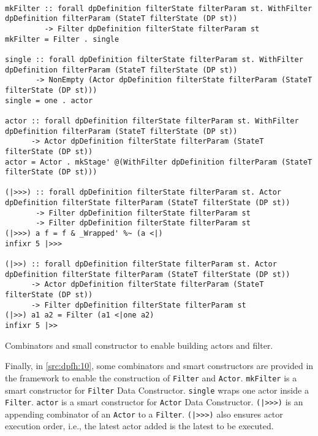 \begin{listing}[h!]
 \scriptsize{
  \begin{verbatim}

mkFilter :: forall dpDefinition filterState filterParam st. WithFilter dpDefinition filterParam (StateT filterState (DP st)) 
         -> Filter dpDefinition filterState filterParam st
mkFilter = Filter . single

single :: forall dpDefinition filterState filterParam st. WithFilter dpDefinition filterParam (StateT filterState (DP st)) 
       -> NonEmpty (Actor dpDefinition filterState filterParam (StateT filterState (DP st)))
single = one . actor

actor :: forall dpDefinition filterState filterParam st. WithFilter dpDefinition filterParam (StateT filterState (DP st)) 
      -> Actor dpDefinition filterState filterParam (StateT filterState (DP st))
actor = Actor . mkStage' @(WithFilter dpDefinition filterParam (StateT filterState (DP st)))

(|>>>) :: forall dpDefinition filterState filterParam st. Actor dpDefinition filterState filterParam (StateT filterState (DP st)) 
       -> Filter dpDefinition filterState filterParam st 
       -> Filter dpDefinition filterState filterParam st
(|>>>) a f = f & _Wrapped' %~ (a <|)
infixr 5 |>>>

(|>>) :: forall dpDefinition filterState filterParam st. Actor dpDefinition filterState filterParam (StateT filterState (DP st)) 
      -> Actor dpDefinition filterState filterParam (StateT filterState (DP st)) 
      -> Filter dpDefinition filterState filterParam st
(|>>) a1 a2 = Filter (a1 <|one a2)
infixr 5 |>>
  \end{verbatim}
  }
  \caption[{[\texttt{Stage.hs}] Filter / Actor smart constructors and combinators}]{Combinators and small constructor to enable building actors and filter.}
  \label{src:dpfh:10}
\end{listing}

Finally, in \autoref{src:dpfh:10}, some combinators and smart constructors are provided in the framework to enable the construction of \texttt{Filter} and \texttt{Actor}.
\texttt{mkFilter} is a smart constructor for \texttt{Filter} Data Constructor. \texttt{single} wraps one actor inside a \texttt{Filter}.
\texttt{actor} is a smart constructor for \texttt{Actor} Data Constructor. \texttt{(|>>>)} is an appending combinator of an \texttt{Actor} to a \texttt{Filter}. 
\texttt{(|>>>)} also ensures actor execution order, i.e., the latest actor added is the latest to be executed.


